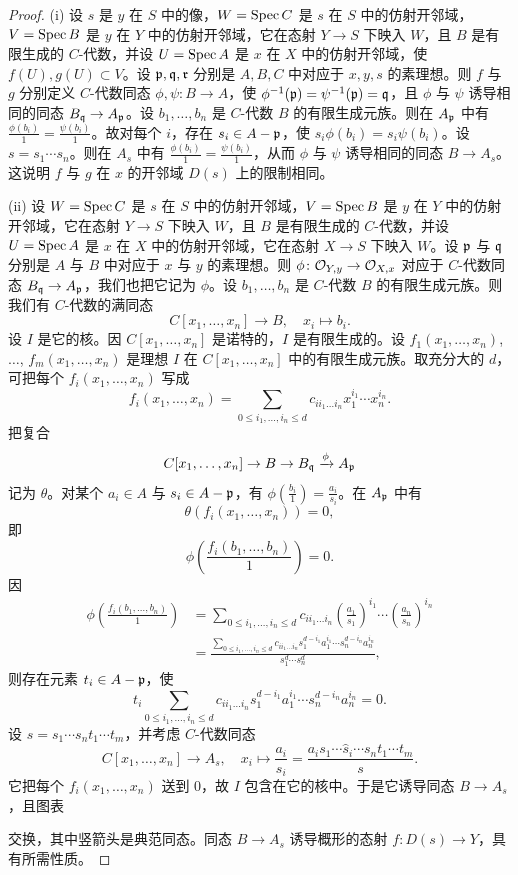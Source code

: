 \begin{proof}
(i) 设 $s$ 是 $y$ 在 $S$ 中的像，$W=\operatorname{Spec} C$ 是 $s$ 在 $S$ 中的仿射开邻域，$V=\operatorname{Spec} B$ 是 $y$ 在 $Y$ 中的仿射开邻域，它在态射 $Y\to S$ 下映入 $W$，且 $B$ 是有限生成的 $C$-代数，并设 $U=\operatorname{Spec} A$ 是 $x$ 在 $X$ 中的仿射开邻域，使 $f(U),g(U)\subset V$。设 $\mathfrak{p},\mathfrak{q},\mathfrak{r}$ 分别是 $A,B,C$ 中对应于 $x,y,s$ 的素理想。则 $f$ 与 $g$ 分别定义 $C$-代数同态 $\phi,\psi\colon B\to A$，使 $\phi^{-1}(\mathfrak{p})=\psi^{-1}(\mathfrak{p})=\mathfrak{q}$，且 $\phi$ 与 $\psi$ 诱导相同的同态 $B_{\mathfrak{q}}\to A_{\mathfrak{p}}$。设 $b_1,\dots,b_n$ 是 $C$-代数 $B$ 的有限生成元族。则在 $A_{\mathfrak{p}}$ 中有 $\frac{\phi(b_i)}{1}=\frac{\psi(b_i)}{1}$。故对每个 $i$，存在 $s_i\in A-\mathfrak{p}$，使 $s_i\phi(b_i)=s_i\psi(b_i)$。设 $s=s_1\cdots s_n$。则在 $A_s$ 中有 $\frac{\phi(b_i)}{1}=\frac{\psi(b_i)}{1}$，从而 $\phi$ 与 $\psi$ 诱导相同的同态 $B\to A_s$。这说明 $f$ 与 $g$ 在 $x$ 的开邻域 $D(s)$ 上的限制相同。

(ii) 设 $W=\operatorname{Spec} C$ 是 $s$ 在 $S$ 中的仿射开邻域，$V=\operatorname{Spec} B$ 是 $y$ 在 $Y$ 中的仿射开邻域，它在态射 $Y\to S$ 下映入 $W$，且 $B$ 是有限生成的 $C$-代数，并设 $U=\operatorname{Spec} A$ 是 $x$ 在 $X$ 中的仿射开邻域，它在态射 $X\to S$ 下映入 $W$。设 $\mathfrak{p}$ 与 $\mathfrak{q}$ 分别是 $A$ 与 $B$ 中对应于 $x$ 与 $y$ 的素理想。则 $\phi\colon \mathcal{O}_{Y,y}\to \mathcal{O}_{X,x}$ 对应于 $C$-代数同态 $B_{\mathfrak{q}}\to A_{\mathfrak{p}}$，我们也把它记为 $\phi$。设 $b_1,\dots,b_n$ 是 $C$-代数 $B$ 的有限生成元族。则我们有 $C$-代数的满同态
\[
C[x_1,\dots,x_n]\to B,\quad x_i\mapsto b_i.
\]
设 $I$ 是它的核。因 $C[x_1,\dots,x_n]$ 是诺特的，$I$ 是有限生成的。设
$f_1(x_1,\dots,x_n)$, $\dots$, $f_m(x_1,\dots,x_n)$ 是理想 $I$ 在 $C[x_1,\dots,x_n]$ 中的有限生成元族。取充分大的 $d$，可把每个 $f_i(x_1,\dots,x_n)$ 写成
\[
f_i(x_1,\dots,x_n)=\sum_{0\le i_1,\dots,i_n\le d} c_{i i_1\dots i_n}x_1^{i_1}\cdots x_n^{i_n}.
\]
把复合
\[
C[x_1,\dots,x_n]\to B\to B_{\mathfrak{q}}\xrightarrow{\phi} A_{\mathfrak{p}}
\]
记为 $\theta$。对某个 $a_i\in A$ 与 $s_i\in A-\mathfrak{p}$，有 $\phi(\frac{b_i}{1})=\frac{a_i}{s_i}$。在 $A_{\mathfrak{p}}$ 中有
\[
\theta(f_i(x_1,\dots,x_n))=0,
\]
即
\[
\phi\left(\frac{f_i(b_1,\dots,b_n)}{1}\right)=0.
\]
因
\[
\begin{aligned}
\phi\left(\frac{f_i(b_1,\dots,b_n)}{1}\right)
&=\sum_{0\le i_1,\dots,i_n\le d} c_{i i_1\dots i_n}\left(\frac{a_1}{s_1}\right)^{i_1}\cdots\left(\frac{a_n}{s_n}\right)^{i_n}\\
&=\frac{\sum_{0\le i_1,\dots,i_n\le d} c_{i i_1\dots i_n}s_1^{d-i_1}a_1^{i_1}\cdots s_n^{d-i_n}a_n^{i_n}}{s_1^d\cdots s_n^d},
\end{aligned}
\]
则存在元素 $t_i\in A-\mathfrak{p}$，使
\[
t_i\sum_{0\le i_1,\dots,i_n\le d} c_{i i_1\dots i_n}s_1^{d-i_1}a_1^{i_1}\cdots s_n^{d-i_n}a_n^{i_n}=0.
\]
设 $s=s_1\cdots s_n t_1\cdots t_m$，并考虑 $C$-代数同态
\[
C[x_1,\dots,x_n]\to A_s,\quad x_i\mapsto \frac{a_i}{s_i}=\frac{a_i s_1\cdots\hat s_i\cdots s_n t_1\cdots t_m}{s}.
\]
它把每个 $f_i(x_1,\dots,x_n)$ 送到 $0$，故 $I$ 包含在它的核中。于是它诱导同态 $B\to A_s$，且图表
\begin{center}
\end{center}
交换，其中竖箭头是典范同态。同态 $B\to A_s$ 诱导概形的态射 $f\colon D(s)\to Y$，具有所需性质。


\end{proof}
